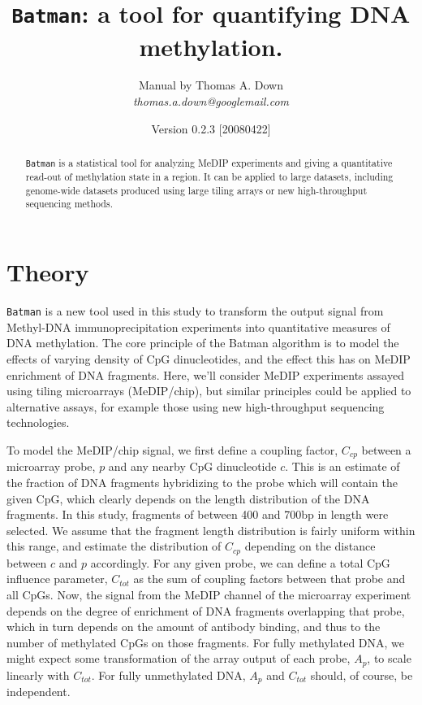 \documentclass[a4paper, 11pt]{article}
\newcommand{\bm}{{\tt Batman}\xspace}
\begin{document}
\title{{\tt Batman}: a tool for quantifying DNA methylation.}
\author{Manual by Thomas A. Down \\ 
  {\it thomas.a.down@googlemail.com}}
\date{Version 0.2.3 [20080422]}
\maketitle

\begin{abstract}
{\tt Batman} is a statistical tool for analyzing MeDIP experiments and giving a
quantitative read-out of methylation state in a region.  It can be applied to
large datasets, including genome-wide datasets produced using large tiling arrays
or new high-throughput sequencing methods.
\end{abstract}

\section{Theory}

\bm is a new tool used in this study to transform the output signal
from Methyl-DNA immunoprecipitation experiments into quantitative
measures of DNA methylation.  The core principle of the Batman
algorithm is to model the effects of varying density of CpG
dinucleotides, and the effect this has on MeDIP enrichment of DNA
fragments.  Here, we'll consider MeDIP experiments assayed using
tiling microarrays (MeDIP/chip), but similar principles could be
applied to alternative assays, for example those using new
high-throughput sequencing technologies.

To model the MeDIP/chip signal, we first define a coupling factor, $C_{cp}$
between a microarray probe, $p$ and any nearby CpG dinucleotide $c$.
This is an estimate of the fraction of DNA fragments hybridizing to the probe
which will contain the given CpG, which clearly depends on the length
distribution of the DNA fragments.  In this study, fragments of between
400 and 700bp in length were selected.  We assume that the fragment
length distribution is fairly uniform within this range, and estimate
the distribution of $C_{cp}$ depending on the distance between $c$ and
$p$ accordingly.
For any given probe, we can define a total CpG influence parameter,
$C_{tot}$ as the sum of coupling factors between that probe and all
CpGs.  Now, the signal from the
MeDIP channel of the microarray experiment depends on the degree of
enrichment of DNA fragments overlapping that probe, which in turn
depends on the amount of antibody binding, and thus to the number of
methylated CpGs on those fragments.  For fully methylated DNA, we
might expect some transformation of the array output of each probe, $A_p$, to scale
linearly with $C_{tot}$.  For fully unmethylated DNA, $A_p$ and $C_{tot}$
should, of course, be independent.  
\end{document}

